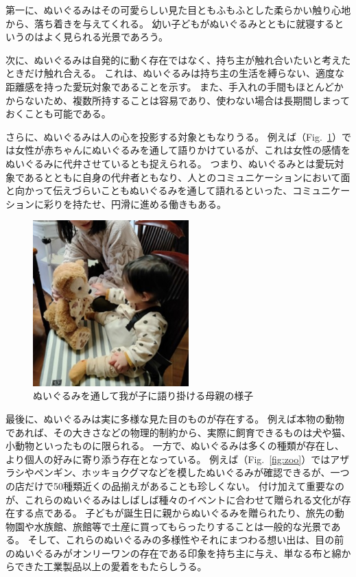 \documentclass[uplatex,a4paper,12pt]{jsarticle}
\renewcommand{\figurename}{Fig.}
\newcommand{\figref}[1]{\figurename~\ref{#1}}
\begin{document}
第一に、ぬいぐるみはその可愛らしい見た目ともふもふとした柔らかい触り心地から、落ち着きを与えてくれる。
幼い子どもがぬいぐるみとともに就寝するというのはよく見られる光景であろう。

次に、ぬいぐるみは自発的に動く存在ではなく、持ち主が触れ合いたいと考えたときだけ触れ合える。
これは、ぬいぐるみは持ち主の生活を縛らない、適度な距離感を持った愛玩対象であることを示す。
また、手入れの手間もほとんどかからないため、複数所持することは容易であり、使わない場合は長期間しまっておくことも可能である。

さらに、ぬいぐるみは人の心を投影する対象ともなりうる。
例えば（\figref{fig:mother}）では女性が赤ちゃんにぬいぐるみを通して語りかけているが、これは女性の感情をぬいぐるみに代弁させているとも捉えられる。
つまり、ぬいぐるみとは愛玩対象であるとともに自身の代弁者ともなり、人とのコミュニケーションにおいて面と向かって伝えづらいこともぬいぐるみを通して語れるといった、コミュニケーションに彩りを持たせ、円滑に進める働きもある。

\begin{figure}[htbp]
  \centering
  \includegraphics[width=6cm]{images/backgrounds/mother.jpg}
  \caption{ぬいぐるみを通して我が子に語り掛ける母親の様子}
  \label{fig:mother}
\end{figure}

最後に、ぬいぐるみは実に多様な見た目のものが存在する。
例えば本物の動物であれば、その大きさなどの物理的制約から、実際に飼育できるものは犬や猫、小動物といったものに限られる。
一方で、ぬいぐるみは多くの種類が存在し、より個人の好みに寄り添う存在となっている。
例えば（\figref{fig:zoo}）ではアザラシやペンギン、ホッキョクグマなどを模したぬいぐるみが確認できるが、一つの店だけで50種類近くの品揃えがあることも珍しくない。
付け加えて重要なのが、これらのぬいぐるみはしばしば種々のイベントに合わせて贈られる文化が存在する点である。
子どもが誕生日に親からぬいぐるみを贈られたり、旅先の動物園や水族館、旅館等で土産に買ってもらったりすることは一般的な光景である。
そして、これらのぬいぐるみの多様性やそれにまつわる想い出は、目の前のぬいぐるみがオンリーワンの存在である印象を持ち主に与え、単なる布と綿からできた工業製品以上の愛着をもたらしうる。
\end{document}
